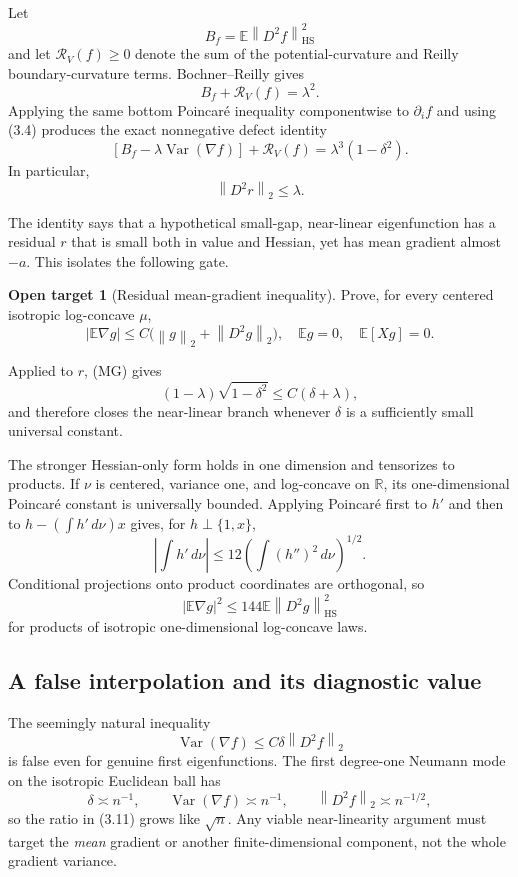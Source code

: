 \documentclass[11pt]{article}
\theoremstyle{definition}
\newtheorem{target}[theorem]{Open target}
\theoremstyle{remark}
\newcommand{\R}{\mathbb R}
\newcommand{\E}{\mathbb E}
\newcommand{\Var}{\operatorname{Var}}
\newcommand{\HS}{\mathrm{HS}}
\newcommand{\1}{\mathbf 1}
\newcommand{\dd}{\,d}
\newcommand{\norm}[1]{\left\lVert #1\right\rVert}
\begin{document}
Let
\[
 B_f=\E\norm{D^2f}_{\HS}^2
\]
and let \(\mathcal R_V(f)\ge0\) denote the sum of the potential-curvature
and Reilly boundary-curvature terms.  Bochner--Reilly gives
\[
 B_f+\mathcal R_V(f)=\lambda^2.                       \tag{3.5}
\]
Applying the same bottom Poincar\'e inequality componentwise to
\(\partial_i f\) and using (3.4) produces the exact nonnegative defect
identity
\[
 \boxed{\quad
 [B_f-\lambda\Var(\nabla f)]+\mathcal R_V(f)
 =\lambda^3(1-\delta^2).
 \quad}                                               \tag{3.6}
\]
In particular,
\[
                         \norm{D^2r}_2\le\lambda.     \tag{3.7}
\]

The identity says that a hypothetical small-gap, near-linear eigenfunction
has a residual \(r\) that is small both in value and Hessian, yet has mean
gradient almost \(-a\).  This isolates the following gate.

\begin{target}[Residual mean-gradient inequality]
Prove, for every centered isotropic log-concave \(\mu\),
\[
 \boxed{\qquad
 |\E\nabla g|
 \le C\bigl(\norm g_2+\norm{D^2g}_2\bigr),
 \quad \E g=0,\quad \E[Xg]=0.
 \qquad}                                              \tag{MG}
\]
\end{target}

Applied to \(r\), (MG) gives
\[
 (1-\lambda)\sqrt{1-\delta^2}\le C(\delta+\lambda), \tag{3.8}
\]
and therefore closes the near-linear branch whenever \(\delta\) is a
sufficiently small universal constant.

The stronger Hessian-only form holds in one dimension and tensorizes to
products.  If \(\nu\) is centered, variance one, and log-concave on
\(\R\), its one-dimensional Poincar\'e constant is universally bounded.
Applying Poincar\'e first to \(h'\) and then to \(h-(\int h'\dd\nu)x\)
gives, for \(h\perp\{1,x\}\),
\[
 \left|\int h'\dd\nu\right|
 \le12\left(\int(h'')^2\dd\nu\right)^{1/2}.          \tag{3.9}
\]
Conditional projections onto product coordinates are orthogonal, so
\[
 |\E\nabla g|^2
 \le144\E\norm{D^2g}_{\HS}^2                         \tag{3.10}
\]
for products of isotropic one-dimensional log-concave laws.

\subsection{A false interpolation and its diagnostic value}

The seemingly natural inequality
\[
 \Var(\nabla f)\le C\delta\norm{D^2f}_2              \tag{3.11}
\]
is false even for genuine first eigenfunctions.  The first degree-one
Neumann mode on the isotropic Euclidean ball has
\[
 \delta\asymp n^{-1},\qquad
 \Var(\nabla f)\asymp n^{-1},\qquad
 \norm{D^2f}_2\asymp n^{-1/2},
\]
so the ratio in (3.11) grows like \(\sqrt n\).  Any viable near-linearity
argument must target the \emph{mean} gradient or another finite-dimensional
component, not the whole gradient variance.
\end{document}
